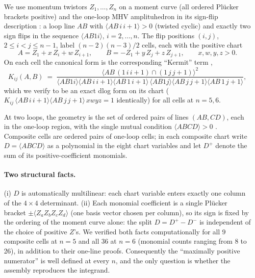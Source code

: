 \documentclass[11pt]{article}
\newcommand{\br}[1]{\langle #1 \rangle}
\begin{document}
We use momentum twistors $Z_1,\dots,Z_n$ on a moment curve (all ordered
Pl\"ucker brackets positive) and the one-loop MHV amplituhedron in its
sign-flip description \citep{ArkaniHamed:2013jha,ArkaniHamed:2013kca,
Kojima:2020gxs}: a loop line $AB$ with $\br{AB\,i\,i{+}1} > 0$ (twisted
cyclic) and exactly two sign flips in the sequence $\br{AB1i}$,
$i = 2,\dots,n$. The flip positions $(i,j)$, $2 \le i < j \le n-1$,
label $(n-2)(n-3)/2$ cells, each with the positive chart
\begin{equation}
A = Z_1 + x\,Z_i + w\,Z_{i+1}, \qquad B = -Z_1 + y\,Z_j + z\,Z_{j+1},
\qquad x,w,y,z > 0 .
\end{equation}
On each cell the canonical form is the corresponding ``Kermit'' term
\citep{ArkaniHamed:2010gh},
\begin{equation}
K_{ij}(A,B) \;=\;
\frac{\br{AB\,(1\,i\,i{+}1)\cap(1\,j\,j{+}1)}^{2}}
{\br{AB1i}\br{AB\,i\,i{+}1}\br{AB\,1\,i{+}1}\,
 \br{AB1j}\br{AB\,j\,j{+}1}\br{AB\,1\,j{+}1}},
\end{equation}
which we verify to be an exact dlog form on its chart
($K_{ij}\,\br{AB\,i\,i{+}1}\br{AB\,j\,j{+}1}\,xwyz = 1$ identically)
for all cells at $n = 5, 6$.

At two loops, the geometry is the set of ordered pairs of lines
$(AB, CD)$, each in the one-loop region, with the single mutual
condition $\br{ABCD} > 0$ \citep{ArkaniHamed:2013kca,Kojima:2020gxs,
Dian:2024tvi}. Composite cells are ordered pairs of one-loop cells;
in each composite chart write $D = \br{ABCD}$ as a polynomial in the
eight chart variables and let $D^{+}$ denote the sum of its
positive-coefficient monomials.

\paragraph{Two structural facts.} (i) $D$ is automatically multilinear:
each chart variable enters exactly one column of the $4\times4$
determinant. (ii) Each monomial coefficient is a single Pl\"ucker
bracket $\pm\br{Z_aZ_bZ_cZ_d}$ (one basis vector chosen per column), so
its sign is fixed by the ordering of the moment curve alone: the split
$D = D^{+} - D^{-}$ is independent of the choice of positive $Z$'s. We
verified both facts computationally for all $9$ composite cells at
$n=5$ and all $36$ at $n=6$ (monomial counts ranging from 8 to 26), in
addition to their one-line proofs. Consequently the ``maximally
positive numerator'' is well defined at every $n$, and the only
question is whether the assembly reproduces the integrand.
\end{document}
